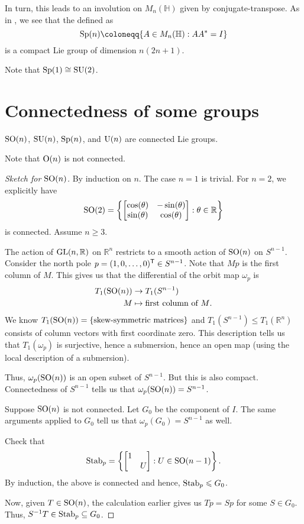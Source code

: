 \documentclass[12pt]{article}
\begin{document}
In turn, this leads to an involution on $M_{n}(\mathbb{H})$ given by conjugate-transpose. 
As in , we see that the  defined as
\begin{equation*} 
	\Sp(n) \coloneqq \{A \in M_{n}(\mathbb{H}) : AA^{\ast} = I\}
\end{equation*}
is a compact Lie group of dimension $n(2n + 1)$.

Note that $\operatorname{Sp}(1) \cong \operatorname{SU}(2)$.

\section{Connectedness of some groups} \label{sec:connectedness}

\begin{thm}
	$\operatorname{SO}(n)$, $\operatorname{SU}(n)$, $\operatorname{Sp}(n)$, and $\operatorname{U}(n)$ are connected Lie groups.
\end{thm}
Note that $\operatorname{O}(n)$ is not connected.

\begin{proof}[Sketch for $\operatorname{SO}(n)$]
	By induction on $n$. The case $n = 1$ is trivial. For $n = 2$, we explicitly have
	\begin{equation*} 
		\operatorname{SO}(2) = \left\{\begin{bmatrix} \cos(\theta) & -\sin(\theta) \\ \sin(\theta) & \cos(\theta) \end{bmatrix} : \theta \in \mathbb{R}\right\}
	\end{equation*}
	is connected. Assume $n \ge 3$.

	The action of $\operatorname{GL}(n, \mathbb{R})$ on $\mathbb{R}^{n}$ restricts to a smooth action of $\operatorname{SO}(n)$ on $S^{n - 1}$. 
	Consider the north pole $p = (1, 0, \ldots, 0)^{\mathsf{T}} \in S^{n - 1}$. Note that $Mp$ is the first column of $M$. This gives us that the differential of the orbit map $\omega_{p}$ is
	\begin{align*} 
		T_{1}(\operatorname{SO}(n)) &\to T_{1}(S^{n - 1}) \\
		M &\mapsto \text{first column of $M$}.
	\end{align*}
	We know $T_{1}(\operatorname{SO}(n)) = \{\text{skew-symmetric matrices}\}$ and 
	$T_{1}(S^{n - 1}) \le T_{1}(\mathbb{R}^{n})$ consists of column vectors with first coordinate zero. 
	This description tells us that $T_{1}(\omega_{p})$ is surjective, hence a submersion, hence an open map (using the local description of a submersion). 

	Thus, $\omega_{p}(\operatorname{SO}(n))$ is an open subset of $S^{n - 1}$. But this is also compact. 
	Connectedness of $S^{n - 1}$ tells us that $\omega_{p}(\operatorname{SO}(n)) = S^{n - 1}$.

	Suppose $\operatorname{SO}(n)$ is not connected. 
	Let $G_{0}$ be the component of $I$. 
	The same arguments applied to $G_{0}$ tell us that $\omega_{p}(G_{0}) = S^{n - 1}$ as well.

	Check that
	\begin{equation*} 
		\operatorname{Stab}_{p} = \left\{\begin{bmatrix} 1 &  \\  & U \end{bmatrix} : U \in \operatorname{SO}(n - 1)\right\}.
	\end{equation*}
	By induction, the above is connected and hence, $\operatorname{Stab}_{p} \leqslant G_{0}$.

	Now, given $T \in \operatorname{SO}(n)$, the calculation earlier gives us $Tp = Sp$ for some $S \in G_{0}$. Thus, $S^{-1} T \in \operatorname{Stab}_{p} \subseteq G_{0}$.
\end{proof}
\end{document}
